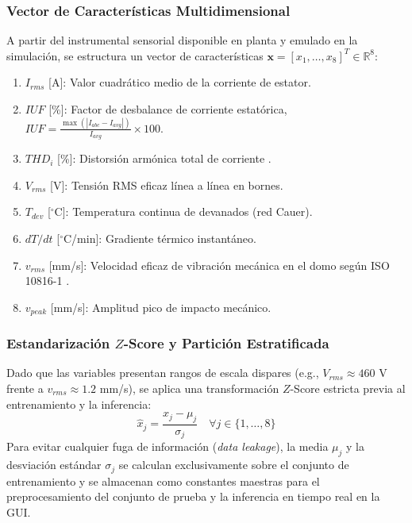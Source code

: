 \documentclass[conference]{IEEEtran}
\begin{document}
\subsubsection{Vector de Características Multidimensional}
A partir del instrumental sensorial disponible en planta y emulado en la simulación, se estructura un vector de características $\mathbf{x} = [x_1, \dots, x_8]^T \in \mathbb{R}^8$:
\begin{enumerate}
    \item $I_{rms}$ [A]: Valor cuadrático medio de la corriente de estator.
    \item $IUF$ [\%]: Factor de desbalance de corriente estatórica, $IUF = \frac{\max(|I_{abc} - I_{avg}|)}{I_{avg}} \times 100$.
    \item $THD_i$ [\%]: Distorsión armónica total de corriente \cite{ieee519}.
    \item $V_{rms}$ [V]: Tensión RMS eficaz línea a línea en bornes.
    \item $T_{dev}$ [$^\circ$C]: Temperatura continua de devanados (red Cauer).
    \item $dT/dt$ [$^\circ$C/min]: Gradiente térmico instantáneo.
    \item $v_{rms}$ [mm/s]: Velocidad eficaz de vibración mecánica en el domo según ISO 10816-1 \cite{iso10816}.
    \item $v_{peak}$ [mm/s]: Amplitud pico de impacto mecánico.
\end{enumerate}

\subsubsection{\texorpdfstring{Estandarización $Z$-Score y Partición Estratificada}{Estandarización Z-Score y Partición Estratificada}}
Dado que las variables presentan rangos de escala dispares (e.g., $V_{rms} \approx 460$ V frente a $v_{rms} \approx 1.2$ mm/s), se aplica una transformación $Z$-Score estricta previa al entrenamiento y la inferencia:
\begin{equation}
    \hat{x}_j = \frac{x_j - \mu_j}{\sigma_j} \quad \forall j \in \{1, \dots, 8\}
    \label{eq:zscore_metodo}
\end{equation}
Para evitar cualquier fuga de información (\textit{data leakage}), la media $\mu_j$ y la desviación estándar $\sigma_j$ se calculan exclusivamente sobre el conjunto de entrenamiento y se almacenan como constantes maestras para el preprocesamiento del conjunto de prueba y la inferencia en tiempo real en la GUI.
\end{document}
